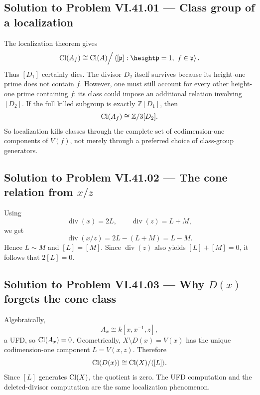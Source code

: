 
\subsection*{Solution to Problem VI.41.01 — Class group of a localization}
\begin{solution}
The localization theorem gives
\[
\Cl(A_f)\cong \Cl(A)\Big/\left\langle[\mathfrak p]:
\height\mathfrak p=1,\ f\in\mathfrak p\right\rangle.
\]
Thus \([D_1]\) certainly dies. The divisor \(D_2\) itself survives because its height-one
prime does not contain \(f\). However, one must still account for every other
height-one prime containing \(f\): its class could impose an additional relation
involving \([D_2]\). If the full killed subgroup is exactly \(\mathbb Z[D_1]\), then
\[
\operatorname{Cl}(A_f)\cong \mathbb Z/3[D_2].
\]
So localization kills classes through the complete set of codimension-one components
of \(V(f)\), not merely through a preferred choice of class-group generators.
\end{solution}

\subsection*{Solution to Problem VI.41.02 — The cone relation from \(x/z\)}
\begin{solution}
Using
\[
\operatorname{div}(x)=2L,\qquad \operatorname{div}(z)=L+M,
\]
we get
\[
\operatorname{div}(x/z)=2L-(L+M)=L-M.
\]
Hence \(L\sim M\) and \([L]=[M]\). Since \(\operatorname{div}(z)\) also yields
\([L]+[M]=0\), it follows that \(2[L]=0\).
\end{solution}

\subsection*{Solution to Problem VI.41.03 — Why \(D(x)\) forgets the cone class}
\begin{solution}
Algebraically,
\[
A_x\cong k[x,x^{-1},z],
\]
a UFD, so \(\operatorname{Cl}(A_x)=0\). Geometrically, \(X\setminus D(x)=V(x)\) has the unique
codimension-one component \(L=V(x,z)\). Therefore
\[
\operatorname{Cl}(D(x))\cong\operatorname{Cl}(X)/\langle[L]\rangle.
\]
Since \([L]\) generates \(\operatorname{Cl}(X)\), the quotient is zero. The UFD computation and the
deleted-divisor computation are the same localization phenomenon.
\end{solution}

